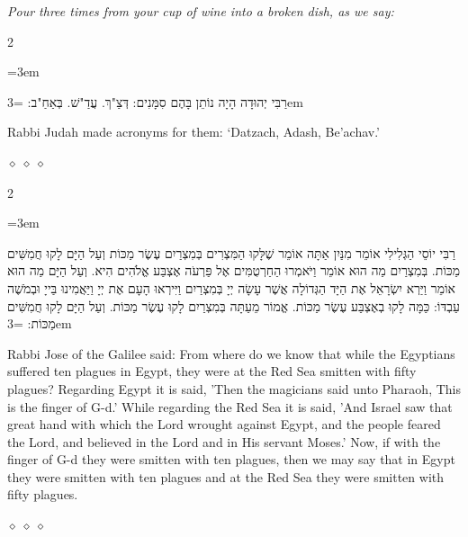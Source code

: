 \documentclass[11pt, openany]{book}
\newcommand{\instruction}[1]{%
  \par\vspace{3pt}
  \begin{tcolorbox}[
    enhanced,
    breakable,
    colback=sederlight,
    colframe=sederlight,
    boxrule=0pt,
    left=10pt,
    right=6pt,
    top=4pt,
    bottom=4pt,
    borderline west={2pt}{0pt}{sederwine!60},
    arc=0pt,
    outer arc=0pt,
  ]
    {\small\itshape\textcolor{sederwine}{#1}}
  \end{tcolorbox}
  \par\vspace{2pt}
}
\newenvironment{bilingual}{%
  \par\vspace{4pt}%
  \begin{paracol}{2}%
}{%
  \end{paracol}%
  \par\vspace{2pt}%
}
\newenvironment{hebrewcol}{%
  \switchcolumn[1]%
  \begingroup
  \RTL
  \hebrewfont\large
  \setstretch{1.4}%
  \emergencystretch=3em
  \tolerance=9999
  \parindent=0pt\relax
}{%
  \endRTL
  \endgroup
}
\newenvironment{englishcol}{%
  \switchcolumn[0]%
  \begingroup
  \setstretch{1.4}%
  \emergencystretch=3em
  \tolerance=9999
  \normalsize
  \rightskip=0.12in\relax
}{%
  \endgroup
}
\newcommand{\parasep}{%
  \par\vspace{3pt}
  \begin{center}
    \textcolor{sedergold!50}{\tiny$\diamond\;\diamond\;\diamond$}
  \end{center}
  \par\vspace{3pt}
}
\begin{document}
\instruction{Pour three times from your cup of wine into a broken dish, as we say:}

\begin{bilingual}
\begin{hebrewcol}
רַבִּי יְהוּדָה הָיָה נוֹתֵן בָּהֶם סִמָּנִים:
דְּצַ"ךְ. עֲדַ"שׁ. בְּאַחַ"ב:
\end{hebrewcol}
\begin{englishcol}
Rabbi Judah made acronyms for them: `Datzach, Adash, Be'achav.'
\end{englishcol}
\end{bilingual}
\parasep

\begin{bilingual}
\begin{hebrewcol}
רַבִּי יוֹסֵי הַגְּלִילִי אוֹמֵר מִנַּיִן אַתָּה אוֹמֵר שֶׁלָּקוּ הַמִּצְרִים בְּמִצְרַיִם עֶשֶׂר מַכּוֹת וְעַל הַיָּם לָקוּ חֲמִשִּׁים מַכּוֹת. בְּמִצְרַיִם מַה הוּא אוֹמֵר וַיֹּאמְרוּ הַחַרְטֻמִּים אֶל פַּרְעֹה אֶצְבַּע אֱלֹהִים הִיא. וְעַל הַיָּם מַה הוּא אוֹמֵר וַיַּרְא יִשְׂרָאֵל אֶת הַיָּד הַגְּדוֹלָה אֲשֶׁר עָשָׂה יְיָ בְּמִצְרַיִם וַיִּירְאוּ הָעָם אֶת יְיָ וַיַּאֲמִינוּ בַּייָ וּבְמֹשֶׁה עַבְדּוֹ: כַּמָּה לָקוּ בְאֶצְבַּע עֶשֶׂר מַכּוֹת. אֱמוֹר מֵעַתָּה בְּמִצְרַיִם לָקוּ עֶשֶׂר מַכּוֹת. וְעַל הַיָּם לָקוּ חֲמִשִּׁים מַכּוֹת:
\end{hebrewcol}
\begin{englishcol}
Rabbi Jose of the Galilee said: From where  do we know that while the Egyptians suffered ten plagues in Egypt, they were at the Red Sea smitten with fifty plagues? Regarding Egypt it is said, 'Then the magicians said unto Pharaoh, This is the finger of G-d.' While regarding the Red Sea it is said, 'And Israel saw that great hand with which the Lord wrought against Egypt, and the people feared the Lord, and believed in the Lord and in His servant Moses.' Now, if with the finger of G-d they were smitten with ten plagues, then we may say that in Egypt they were smitten with ten plagues and at the Red Sea they were smitten with fifty plagues.
\end{englishcol}
\end{bilingual}
\parasep
\end{document}
